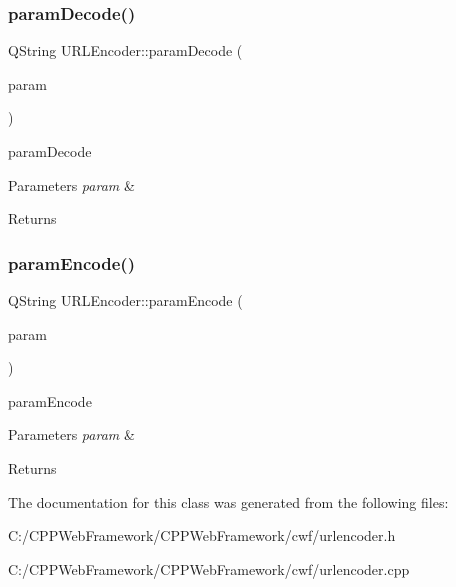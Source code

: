\subsubsection{\texorpdfstring{param\+Decode()}{paramDecode()}}
{\footnotesize\ttfamily Q\+String U\+R\+L\+Encoder\+::param\+Decode (\begin{DoxyParamCaption}\item[{const Q\+Byte\+Array \&}]{param }\end{DoxyParamCaption})\hspace{0.3cm}{\ttfamily [static]}}



param\+Decode 


\begin{DoxyParams}{Parameters}
{\em param} & \\
\hline
\end{DoxyParams}
\begin{DoxyReturn}{Returns}

\end{DoxyReturn}
\mbox{\label{class_u_r_l_encoder_a1621d8a57c2fd83dabce790a8eeef976}} 
\subsubsection{\texorpdfstring{param\+Encode()}{paramEncode()}}
{\footnotesize\ttfamily Q\+String U\+R\+L\+Encoder\+::param\+Encode (\begin{DoxyParamCaption}\item[{const Q\+Byte\+Array \&}]{param }\end{DoxyParamCaption})\hspace{0.3cm}{\ttfamily [static]}}



param\+Encode 


\begin{DoxyParams}{Parameters}
{\em param} & \\
\hline
\end{DoxyParams}
\begin{DoxyReturn}{Returns}

\end{DoxyReturn}


The documentation for this class was generated from the following files\+:\begin{DoxyCompactItemize}
\item 
C\+:/\+C\+P\+P\+Web\+Framework/\+C\+P\+P\+Web\+Framework/cwf/urlencoder.\+h\item 
C\+:/\+C\+P\+P\+Web\+Framework/\+C\+P\+P\+Web\+Framework/cwf/urlencoder.\+cpp\end{DoxyCompactItemize}
